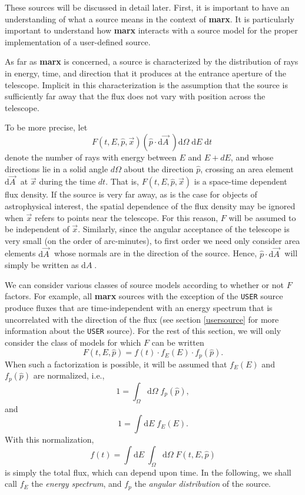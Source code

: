 \documentclass{article}
\newcommand{\p}{\hat{p}}
\newcommand{\x}{\vec{x}}
\newcommand{\marx}{{\bf marx}}
\renewcommand{\d}[1]{\mbox{d}#1\;}
\begin{document}
  These sources will be discussed in detail later.  First, it is
  important to have an understanding of what a source means in the
  context of \marx{}.  It is particularly important to understand how
  \marx{} interacts with a source model for the proper implementation of
  a user-defined source.

  As far as \marx{} is concerned, a source is characterized by the
  distribution of rays in energy, time, and direction that it produces
  at the entrance aperture of the telescope.  Implicit in this
  characterization is the assumption that the source is sufficiently
  far away that the flux does not vary with position across the
  telescope.  

  To be more precise, let
\begin{equation}
     F(t,E,\p,\x) (\p\cdot\d{\vec{A}}) \d{\Omega} \d{E} \d{t}
\end{equation}
  denote the number of rays with energy between $E$ and $E + dE$, and
  whose directions lie in a solid angle $d\Omega$ about the direction
  $\p$, crossing an area element $\d{\vec{A}}$ at $\x$ during the time
  $dt$. That is, $F(t,E,\p,\x)$ is a space-time dependent flux
  density.  If the source is very far away, as is the case for objects
  of astrophysical interest, the spatial dependence of the flux
  density may be ignored when $\x$ refers to points near the
  telescope.  For this reason, $F$ will be assumed to be independent
  of $\x$. Similarly, since the angular acceptance of the telescope is
  very small (on the order of arc-minutes), to first order we need
  only consider area elements $\d{\vec{A}}$ whose normals are in the
  direction of the source.  Hence, $\p\cdot\d{\vec{A}}$ will simply be
  written as $\d{A}$.

  We can consider various classes of source models according to
  whether or not $F$ factors.  For example, all \marx{} sources with
  the exception of the \verb|USER| source produce fluxes that are
  time-independent with an energy spectrum that is uncorrelated with
  the direction of the flux (see section \ref{usersource} for more
  information about the \verb|USER| source). For the rest of this
  section, we will only consider the class of models for which $F$ can
  be written
\begin{equation}
     F(t,E,\p) = f(t) \cdot f_E(E) \cdot f_p(\p).
\end{equation}
  When such a factorization is possible, it will be assumed that $f_E(E)$
  and $f_p(\p)$ are normalized, i.e.,
\begin{equation}
     1 = \int_{\Omega} \d{\Omega} f_p(\p),
\end{equation}
  and 
\begin{equation}
     1 = \int\d{E} f_E(E) .
\end{equation} 
  With this normalization,
\begin{equation} 
    f(t) = \int \d{E} \int_{\Omega} \d{\Omega} F(t, E, \p)
\end{equation}
 is simply the total flux, which can depend upon time.
 In the following, we shall call $f_E$ the {\em energy spectrum}, and
 $f_p$ the {\em angular distribution} of the source.
\end{document}
